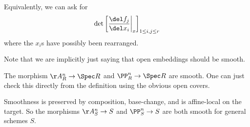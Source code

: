 \documentclass[../notes.tex]{subfiles}
\begin{document}
Equivalently, we can ask for
\[\det\left[\frac{\del f_j}{\del x_i}\bigg|_x\right]_{1\le i,j\le r}\]
where the $x_i$s have possibly been rearranged.
\begin{remark}
	Note that we are implicitly just saying that open embeddings should be smooth.
\end{remark}
\begin{example}
	The morphism $\AA^n_R\to\Spec R$ and $\PP^n_R\to\Spec R$ are smooth. One can just check this directly from the definition using the obvious open covers.
\end{example}
\begin{remark}
	Smoothness is preserved by composition, base-change, and is affine-local on the target. So the morphisms $\AA^n_S\to S$ and $\PP^n_S\to S$ are both smooth for general schemes $S$.
\end{remark}
\end{document}
